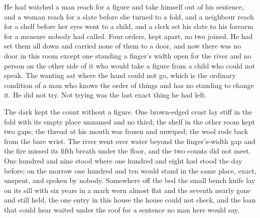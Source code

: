 He had watched a man reach for a figure and take himself out of his sentence, and a woman reach for a slate before she turned to a fold, and a neighbour reach for a shelf before her eyes went to a child, and a clerk set his slate to his forearm for a measure nobody had called. Four orders, kept apart, no two joined. He had set them all down and carried none of them to a door, and now there was no door in this room except one standing a finger's width open for the river and no person on the other side of it who would take a figure from a child who could not speak. The wanting sat where the hand could not go, which is the ordinary condition of a man who knows the order of things and has no standing to change it. He did not try. Not trying was the last exact thing he had left.

The dark kept the count without a figure. One brown-edged crust lay stiff in the fold with its empty place unnamed and no third; the shelf in the other room kept two gaps; the thread at his mouth was frozen and unwiped; the wool rode back from the bare wrist. The river went over water beyond the finger's-width gap and the fire missed its fifth breath under the floor, and the two counts did not meet. One hundred and nine stood where one hundred and eight had stood the day before; on the morrow one hundred and ten would stand in the same place, exact, unspent, and spoken by nobody. Somewhere off the bed the small bench knife lay on its sill with six years in a mark worn almost flat and the seventh nearly gone and still held, the one entry in this house the house could not check, and the loan that could hear waited under the roof for a sentence no man here would say.
